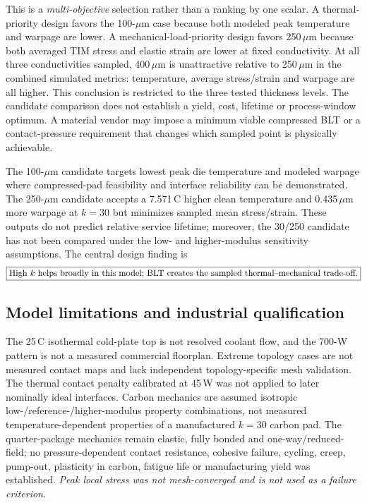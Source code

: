 \documentclass[10pt,a4paper]{article}
\begin{document}
This is a \emph{multi-objective} selection rather than a ranking by one scalar.
A thermal-priority design favors the 100-$\mu$m case because both modeled peak temperature
and warpage are lower. A mechanical-load-priority design favors 250\,$\mu$m because
both averaged TIM stress and elastic strain are lower at fixed conductivity.
At all three conductivities sampled, 400\,$\mu$m is unattractive relative to
250\,$\mu$m in the combined simulated metrics: temperature, average stress/strain and warpage
are all higher. This conclusion is restricted to the three tested thickness levels.
The candidate comparison does not establish a yield, cost, lifetime or process-window optimum.
A material vendor may impose a minimum viable compressed BLT or a contact-pressure
requirement that changes which sampled point is physically achievable.

The 100-$\mu$m candidate targets lowest peak die temperature and modeled warpage where
compressed-pad feasibility and interface reliability can be demonstrated.
The 250-$\mu$m candidate accepts a 7.571\,\textdegree C higher clean temperature and
0.435\,$\mu$m more warpage at $k=30$ but minimizes sampled mean stress/strain.
These outputs do not predict relative service lifetime; moreover, the 30/250 candidate has
not been compared under the low- and higher-modulus sensitivity assumptions. The central design finding is
\[
\fbox{$\displaystyle\text{High } k \text{ helps broadly in this model; BLT creates the sampled thermal--mechanical trade-off.}$}
\]

\subsection{Model limitations and industrial qualification}
The 25\,\textdegree C isothermal cold-plate top is not resolved coolant flow, and the 700-W
pattern is not a measured commercial floorplan. Extreme topology cases are not measured
contact maps and lack independent topology-specific mesh validation. The thermal contact
penalty calibrated at 45\,W was not applied to later nominally ideal interfaces. Carbon
mechanics are assumed isotropic low-/reference-/higher-modulus property combinations, not measured
temperature-dependent properties of a manufactured $k=30$ carbon pad.
The quarter-package mechanics remain elastic, fully bonded and one-way/reduced-field;
no pressure-dependent contact resistance, cohesive failure, cycling, creep, pump-out,
plasticity in carbon, fatigue life or manufacturing yield was established.
\emph{Peak local stress was not mesh-converged and is not used as a failure criterion.}
\end{document}
